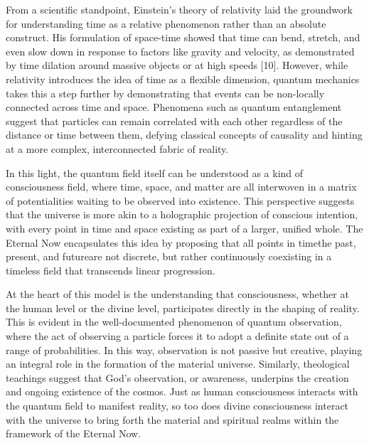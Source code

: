 
From a scientific standpoint, Einstein’s theory of relativity laid the groundwork for understanding time as a relative phenomenon rather than an absolute construct. His formulation of space-time showed that time can bend, stretch, and even slow down in response to factors like gravity and velocity, as demonstrated by time dilation around massive objects or at high speeds [10]. However, while relativity introduces the idea of time as a flexible dimension, quantum mechanics takes this a step further by demonstrating that events can be non-locally connected across time and space. Phenomena such as quantum entanglement suggest that particles can remain correlated with each other regardless of the distance or time between them, defying classical concepts of causality and hinting at a more complex, interconnected fabric of reality.


In this light, the quantum field itself can be understood as a kind of consciousness field, where time, space, and matter are all interwoven in a matrix of potentialities waiting to be observed into existence. This perspective suggests that the universe is more akin to a holographic projection of conscious intention, with every point in time and space existing as part of a larger, unified whole. The Eternal Now encapsulates this idea by proposing that all points in timethe past, present, and futureare not discrete, but rather continuously coexisting in a timeless field that transcends linear progression.

At the heart of this model is the understanding that consciousness, whether at the human level or the divine level, participates directly in the shaping of reality. This is evident in the well-documented phenomenon of quantum observation, where the act of observing a particle forces it to adopt a definite state out of a range of probabilities. In this way, observation is not passive but creative, playing an integral role in the formation of the material universe. Similarly, theological teachings suggest that God’s observation, or awareness, underpins the creation and ongoing existence of the cosmos. Just as human consciousness interacts with the quantum field to manifest reality, so too does divine consciousness interact with the universe to bring forth the material and spiritual realms within the framework of the Eternal Now.


